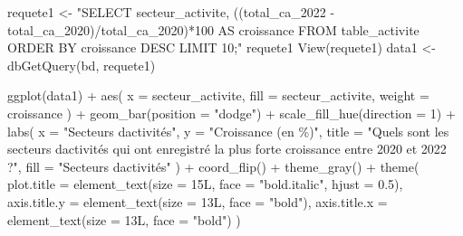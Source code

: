 \documentclass[mstat,12pt]{unswthesis}
\newenvironment{Shaded}{\begin{snugshade}}{\end{snugshade}}
\newcommand{\AttributeTok}[1]{\textcolor[rgb]{0.77,0.63,0.00}{#1}}
\newcommand{\DecValTok}[1]{\textcolor[rgb]{0.00,0.00,0.81}{#1}}
\newcommand{\FloatTok}[1]{\textcolor[rgb]{0.00,0.00,0.81}{#1}}
\newcommand{\FunctionTok}[1]{\textcolor[rgb]{0.00,0.00,0.00}{#1}}
\newcommand{\NormalTok}[1]{#1}
\newcommand{\OtherTok}[1]{\textcolor[rgb]{0.56,0.35,0.01}{#1}}
\newcommand{\SpecialCharTok}[1]{\textcolor[rgb]{0.00,0.00,0.00}{#1}}
\newcommand{\StringTok}[1]{\textcolor[rgb]{0.31,0.60,0.02}{#1}}
\begin{document}
\begin{Shaded}
\begin{Highlighting}[]
\NormalTok{requete1 }\OtherTok{\textless{}{-}} \StringTok{"SELECT secteur\_activite,}
\StringTok{((total\_ca\_2022 {-} total\_ca\_2020)/total\_ca\_2020)*100 AS croissance}
\StringTok{FROM table\_activite}
\StringTok{ORDER BY croissance DESC}
\StringTok{LIMIT 10;"}
\NormalTok{requete1}
\FunctionTok{View}\NormalTok{(requete1)}
\NormalTok{data1 }\OtherTok{\textless{}{-}} \FunctionTok{dbGetQuery}\NormalTok{(bd, requete1)}

\FunctionTok{ggplot}\NormalTok{(data1) }\SpecialCharTok{+}
  \FunctionTok{aes}\NormalTok{(}
    \AttributeTok{x =}\NormalTok{ secteur\_activite,}
    \AttributeTok{fill =}\NormalTok{ secteur\_activite,}
    \AttributeTok{weight =}\NormalTok{ croissance}
\NormalTok{  ) }\SpecialCharTok{+}
  \FunctionTok{geom\_bar}\NormalTok{(}\AttributeTok{position =} \StringTok{"dodge"}\NormalTok{) }\SpecialCharTok{+}
  \FunctionTok{scale\_fill\_hue}\NormalTok{(}\AttributeTok{direction =} \DecValTok{1}\NormalTok{) }\SpecialCharTok{+}
  \FunctionTok{labs}\NormalTok{(}
    \AttributeTok{x =} \StringTok{"Secteurs d\textquotesingle{}activités"}\NormalTok{,}
    \AttributeTok{y =} \StringTok{"Croissance (en \%)"}\NormalTok{,}
    \AttributeTok{title =} \StringTok{"Quels sont les secteurs d\textquotesingle{}activités qui ont enregistré la plus forte croissance entre 2020 et 2022 ?"}\NormalTok{,}
    \AttributeTok{fill =} \StringTok{"Secteurs d\textquotesingle{}activités"}
\NormalTok{  ) }\SpecialCharTok{+}
  \FunctionTok{coord\_flip}\NormalTok{() }\SpecialCharTok{+}
  \FunctionTok{theme\_gray}\NormalTok{() }\SpecialCharTok{+}
  \FunctionTok{theme}\NormalTok{(}
    \AttributeTok{plot.title =} \FunctionTok{element\_text}\NormalTok{(}\AttributeTok{size =}\NormalTok{ 15L,}
                              \AttributeTok{face =} \StringTok{"bold.italic"}\NormalTok{,}
                              \AttributeTok{hjust =} \FloatTok{0.5}\NormalTok{),}
    \AttributeTok{axis.title.y =} \FunctionTok{element\_text}\NormalTok{(}\AttributeTok{size =}\NormalTok{ 13L,}
                                \AttributeTok{face =} \StringTok{"bold"}\NormalTok{),}
    \AttributeTok{axis.title.x =} \FunctionTok{element\_text}\NormalTok{(}\AttributeTok{size =}\NormalTok{ 13L,}
                                \AttributeTok{face =} \StringTok{"bold"}\NormalTok{)}
\NormalTok{  )}
\end{Highlighting}
\end{Shaded}

\medskip
\end{document}
